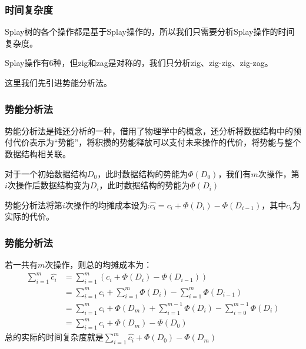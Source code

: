 \documentclass[utf8]{ctexbeamer}
\begin{document}
    \begin{frame}
        \frametitle{时间复杂度}
        Splay树的各个操作都是基于Splay操作的，所以我们只需要分析Splay操作的时间复杂度。

        Splay操作有6种，但zig和zag是对称的，我们只分析zig、zig-zig、zig-zag。

        这里我们先引进势能分析法。
    \end{frame}

    \begin{frame}
        \frametitle{势能分析法}
        势能分析法是摊还分析的一种，借用了物理学中的概念，还分析将数据结构中的预付代价表示为“势能”，将积攒的势能释放可以支付未来操作的代价，将势能与整个数据结构相关联。
        
        对于一个初始数据结构$D_0$，此时数据结构的势能为$\Phi(D_0)$，我们有$m$次操作，第$i$次操作后数据结构变为$D_i$，此时数据结构的势能为$\Phi(D_i)$

        势能分析法将第$i$次操作的均摊成本设为:$\hat{c_i}=c_i+\Phi(D_i)-\Phi(D_{i-1})$，其中$c_i$为实际的代价。
    \end{frame}

    \begin{frame}
        \frametitle{势能分析法}
        若一共有$m$次操作，则总的均摊成本为：
        \begin{align}
            \sum_{i=1}^m\hat{c_i}&=\sum_{i=1}^m(c_i+\Phi(D_i)-\Phi(D_{i-1}))\nonumber\\
                                 &=\sum_{i=1}^mc_i+\sum_{i=1}^m\Phi(D_i)-\sum_{i=1}^m\Phi(D_{i-1})\nonumber\\
                                 &=\sum_{i=1}^mc_i+\Phi(D_m)+\sum_{i=1}^{m-1}\Phi(D_i)-\sum_{i=0}^{m-1}\Phi(D_i)\nonumber\\
                                 &=\sum_{i=1}^mc_i+\Phi(D_m)-\Phi(D_0)\nonumber
        \end{align}
        总的实际的时间复杂度就是$\sum_{i=1}^m\hat{c_i}+\Phi(D_0)-\Phi(D_m)$
    \end{frame}
\end{document}
